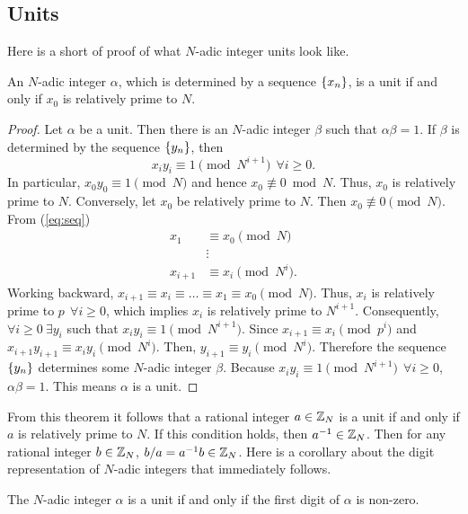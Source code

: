 \subsection{Units}
Here is a short of proof of what $N$-adic integer units look like.

\begin{theorem}\label{thm:units}
  An $N$-adic integer $\alpha$, which is determined by a sequence $\{x_n\}$, is
  a unit if and only if $x_0$ is relatively prime to $N$.
\end{theorem}
\begin{proof}
  Let $\alpha$ be a unit. Then there is an $N$-adic integer $\beta$ such that
  $\alpha\beta=1$. If $\beta$ is determined by the sequence $\{y_n\}$, then
  \begin{equation}\label{eq:units}
    x_iy_i\equiv1\pmod{N^{i+1}} \ \ \forall i \geq 0.
  \end{equation}
  In particular, $x_0y_0\equiv1\pmod N$ and hence $x_0\not\equiv0\bmod N$.
  Thus, $x_0$ is relatively prime to $N$.
  Conversely, let $x_0$ be relatively prime to $N$. Then $x_0\not\equiv0\pmod{N}$.
  From (\ref{eq:seq})
  \begin{align*}
    x_1 &\equiv x_0 \pmod N\\
    &\vdots \\
    x_{i+1} &\equiv x_i \pmod{N^i}. 
  \end{align*}
  Working backward, $x_{i+1} \equiv x_i \equiv \dots \equiv x_1 \equiv x_0 \pmod N$.
  Thus, $x_i$ is relatively prime to $p \ \ \forall i\geq0$, which implies
  $x_i$ is relatively prime to $N^{i+1}$. Consequently, $\forall i\geq0 \
  \exists y_i$ such that $x_iy_i \equiv 1 \pmod{N^{i+1}}$. Since
  $x_{i+1} \equiv x_i \pmod p^i$ and $x_{i+1}y_{i+1} \equiv x_iy_i \pmod{N^i}$.
  Then, $y_{i+1} \equiv y_i \pmod{N^i}$. Therefore the sequence $\{y_n\}$ determines
  some $N$-adic integer $\beta$. Because $x_iy_i \equiv 1 \pmod{N^{i+1}} \ \ \forall i \geq 0$,
  $\alpha\beta=1$. This means $\alpha$ is a unit.
\end{proof}

\par From this theorem it follows that a rational integer $a\in\mathbb{Z}_N$ is a unit if
and only if $a$ is relatively prime to $N$. If this condition holds, then $a^{-1}\in\mathbb{Z}_N$.
Then for any rational integer $b\in\mathbb{Z}_N$, $b/a=a^{-1}b\in\mathbb{Z}_N$. Here is a corollary
about the digit representation of $N$-adic integers that immediately follows.

\begin{corollary}
	The $N$-adic integer $\alpha$ is a unit if and only if the first digit of $\alpha$ is non-zero.
\end{corollary}


